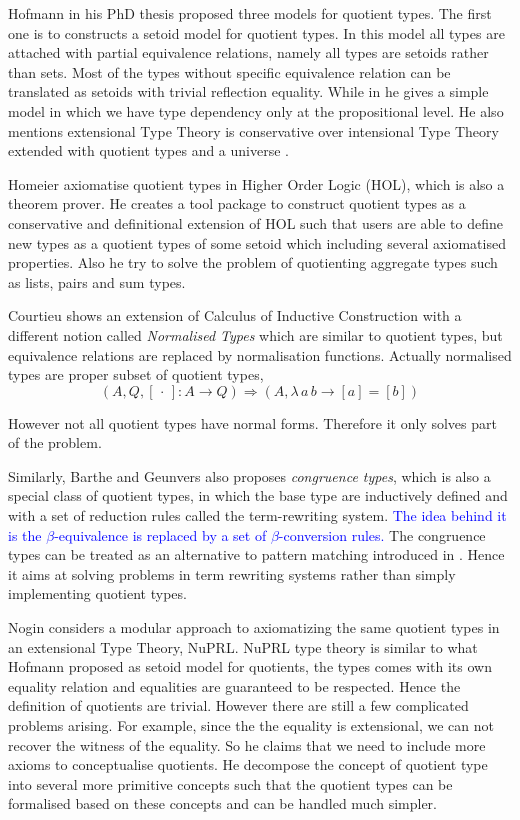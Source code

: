 \documentclass[envcountsame]{llncs}
\newcommand{\ed}[1]{\textcolor{blue}{#1}}
\newcommand{\dotph}{\,\cdot\,}
\providecommand{\class}[1]{[#1]}
\newcommand{\itt}{intensional Type Theory}
\begin{document}
Hofmann in his PhD thesis \cite{hof:phd} proposed three models for quotient types. The first one is to constructs a setoid model for quotient types. In this model all types are attached with partial equivalence relations, namely all types are setoids rather than sets. Most of the types without specific equivalence relation can be translated as setoids with trivial reflection equality. While in \cite{hof:95:sm} he gives a simple model in which we have type dependency only at the propositional level.
He also mentions extensional Type Theory is conservative over \itt {}  extended with quotient types and a universe \cite{hof:95:con}.

Homeier \cite{hom} axiomatise quotient types in Higher Order Logic (HOL), which is also a theorem prover.
He creates a tool package to construct quotient types as a conservative and definitional extension of HOL such that users are able to define new types as a quotient types of some setoid which including several axiomatised properties. Also he try to solve the problem of quotienting aggregate types such as lists, pairs and sum types.



Courtieu \cite{cou:01} shows an extension of Calculus of Inductive Construction
with a different notion called \emph{Normalised Types} which are similar to quotient types, but equivalence relations are replaced by normalisation functions. Actually normalised types are proper subset of quotient types,
\[ (A, Q, \class\dotph \colon A \to Q) \Rightarrow(A, \lambda \,a \,b\to \class a = \class b)\]

However not all quotient types have normal forms. Therefore it only solves part of the problem.

Similarly, Barthe and Geunvers \cite{bar:96} also proposes \emph{congruence types}, which is also a special class of quotient types, in which the base type are inductively defined and with a set of reduction rules called the term-rewriting system. \ed{The idea behind it is the $\beta$-equivalence is replaced by a set of $\beta$-conversion rules.} The congruence types can be treated as an alternative to pattern matching introduced in \cite{coq:92}.
Hence it aims at solving problems in term rewriting systems rather than simply implementing quotient types.

Nogin \cite{nog:02} considers a modular approach to axiomatizing the same quotient types in an extensional Type Theory, NuPRL. NuPRL type theory is similar to what Hofmann proposed as setoid model for quotients, the types comes with its own equality relation and equalities are guaranteed to be respected. Hence the definition of quotients are trivial.
However there are still a few complicated problems arising. For example, since the the equality is extensional, we can not recover the witness of the equality. So he claims that we need to include more axioms to conceptualise quotients. He decompose the concept of quotient type into several more primitive concepts such that the quotient types can be formalised based on these concepts and can be handled much simpler. 
\end{document}
